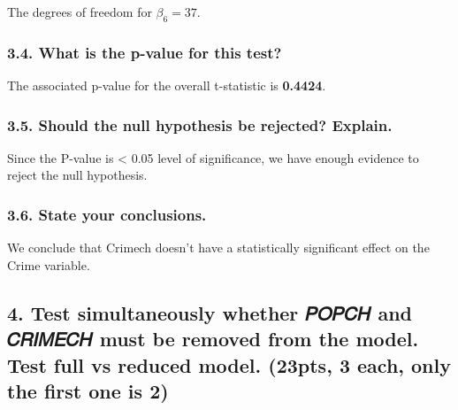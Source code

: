 \documentclass[
]{article}
\begin{document}
The degrees of freedom for \(\beta_6 = 37\).

\subsubsection{3.4. What is the p-value for this
test?}\label{what-is-the-p-value-for-this-test-6}

The associated p-value for the overall t-statistic is \textbf{0.4424}.

\subsubsection{3.5. Should the null hypothesis be rejected?
Explain.}\label{should-the-null-hypothesis-be-rejected-explain.-6}

Since the P-value is \textless{} 0.05 level of significance, we have
enough evidence to reject the null hypothesis.

\subsubsection{3.6. State your
conclusions.}\label{state-your-conclusions.-6}

We conclude that Crimech doesn't have a statistically significant effect
on the Crime variable.

\subsection{4. Test simultaneously whether 𝑃𝑂𝑃𝐶𝐻 and 𝐶𝑅𝐼𝑀𝐸𝐶𝐻 must be
removed from the model. Test full vs reduced model. (23pts, 3 each, only
the first one is
2)}\label{test-simultaneously-whether-ux1d443ux1d442ux1d443ux1d436ux1d43b-and-ux1d436ux1d445ux1d43cux1d440ux1d438ux1d436ux1d43b-must-be-removed-from-the-model.-test-full-vs-reduced-model.-23pts-3-each-only-the-first-one-is-2}
\end{document}
